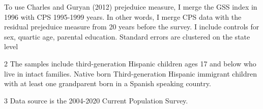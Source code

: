 \begin{table}[H]
{\begin{threeparttable}
\begin{tablenotes}
{                      To use Charles and Guryan (2012) prejeduice measure, I merge the GSS index in 1996 with CPS 1995-1999 years. 
                      In other words, I merge CPS data with the residual prejeduice measure from 20 years before the survey.
                      I include controls for sex, quartic age, parental education.
                      Standard errors are clustered on the state level}
\item[2] \footnotesize{The samples include third-generation Hispanic children ages 17 and below who live in intact families. 
                      Native born Third-generation Hispanic 
                      immigrant children with at least one grandparent born in a Spanish speaking 
                      country.}
\item[3] \footnotesize{Data source is the 2004-2020 Current Population Survey.}
\end{tablenotes}
\end{threeparttable}}
\end{table}
